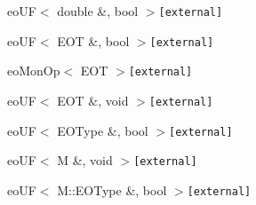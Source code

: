 \begin{CompactList}
\begin{CompactList}
\begin{CompactList}
\begin{CompactList}
\item {}
\item {}
\end{CompactList}
\end{CompactList}
\item eo\-UF$<$ double \&, bool $>${\tt  [external]}\begin{CompactList}
\item {}
\begin{CompactList}
\item {}
\item {}
\end{CompactList}
\end{CompactList}
\item eo\-UF$<$ EOT \&, bool $>${\tt  [external]}\begin{CompactList}
\item eo\-Mon\-Op$<$ EOT $>${\tt  [external]}\begin{CompactList}
\item {}
\end{CompactList}
\end{CompactList}
\item eo\-UF$<$ EOT \&, void $>${\tt  [external]}\begin{CompactList}
\item {}
\end{CompactList}
\item eo\-UF$<$ EOType \&, bool $>${\tt  [external]}\item eo\-UF$<$ M \&, void $>${\tt  [external]}\begin{CompactList}
\item {}
\end{CompactList}
\item eo\-UF$<$ M::EOType \&, bool $>${\tt  [external]}\begin{CompactList}

\end{CompactList}
\end{CompactList}
\end{CompactList}
